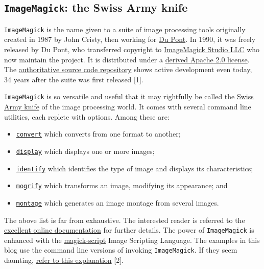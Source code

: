\documentclass[
  11pt,
  british,
  a4paper,
]{article}
\providecommand{\tightlist}{%
  \setlength{\itemsep}{0pt}\setlength{\parskip}{0pt}}
\begin{document}
\hypertarget{imagemagick-the-swiss-army-knife}{%
\subsection{\texorpdfstring{\texttt{ImageMagick}: the Swiss Army
knife}{ImageMagick: the Swiss Army knife}}\label{imagemagick-the-swiss-army-knife}}

\texttt{ImageMagick} is the name given to a suite of image processing
tools originally created in 1987 by John Cristy, then working for
\href{https://www.dupont.com/}{Du Pont}. In 1990, it was freely released
by Du Pont, who transferred copyright to
\href{https://imagemagick.org/script/contact.php}{ImageMagick Studio
LLC} who now maintain the project. It is distributed under a
\href{https://imagemagick.org/script/license.php}{derived Apache 2.0
license}. The
\href{https://github.com/ImageMagick/ImageMagick}{authoritative source
code repository} shows active development even today, 34 years after the
suite was first released {[}1{]}.

\texttt{ImageMagick} is so versatile and useful that it may rightfully
be called the
\href{https://www.thefreedictionary.com/Swiss-army+knife}{Swiss Army
knife} of the image processing world. It comes with several command line
utilities, each replete with options. Among these are:

\begin{itemize}
\tightlist
\item
  \href{https://imagemagick.org/script/convert.php}{\texttt{convert}}
  which converts from one format to another;
\item
  \href{https://imagemagick.org/script/display.php}{\texttt{display}}
  which displays one or more images;
\item
  \href{https://imagemagick.org/script/identify.php}{\texttt{identify}}
  which identifies the type of image and displays its characteristics;
\item
  \href{https://imagemagick.org/script/mogrify.php}{\texttt{mogrify}}
  which transforms an image, modifying its appearance; and
\item
  \href{https://imagemagick.org/script/montage.php}{\texttt{montage}}
  which generates an image montage from several images.
\end{itemize}

The above list is far from exhaustive. The interested reader is referred
to the
\href{https://imagemagick.org/script/command-line-tools.php}{excellent
online documentation} for further details. The power of
\texttt{ImageMagick} is enhanced with the
\href{https://imagemagick.org/script/magick-script.php}{magick-script}
Image Scripting Language. The examples in this blog use the command line
versions of invoking \texttt{ImageMagick}. If they seem daunting,
\href{https://imagemagick.org/script/command-line-processing.php}{refer
to this explanation} {[}2{]}.
\end{document}
